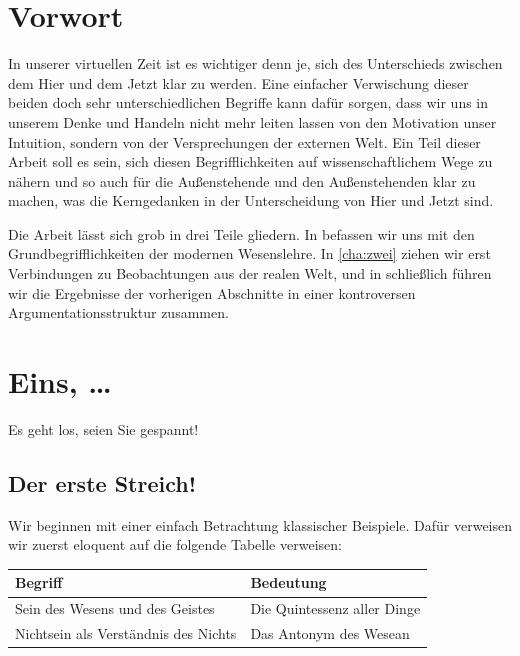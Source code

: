 \documentclass{scrbook}
\begin{document}
\chapter*{Vorwort}

In unserer virtuellen Zeit ist es wichtiger denn je, sich des Unterschieds
zwischen dem Hier und dem Jetzt klar zu werden.  Eine einfacher Verwischung
dieser beiden doch sehr unterschiedlichen Begriffe kann dafür sorgen, dass wir
uns in unserem Denke und Handeln nicht mehr leiten lassen von den Motivation
unser Intuition, sondern von der Versprechungen der externen Welt.  Ein Teil
dieser Arbeit soll es sein, sich diesen Begrifflichkeiten auf wissenschaftlichem
Wege zu nähern und so auch für die Außenstehende und den Außenstehenden klar zu
machen, was die Kerngedanken in der Unterscheidung von Hier und Jetzt sind.

Die Arbeit lässt sich grob in drei Teile gliedern.  In  befassen
wir uns mit den Grundbegrifflichkeiten der modernen Wesenslehre.  In
\ref{cha:zwei} ziehen wir erst Verbindungen zu Beobachtungen aus der realen
Welt, und in  schließlich führen wir die Ergebnisse der
vorherigen Abschnitte in einer kontroversen Argumentationsstruktur zusammen.

\cleardoublepage

\tableofcontents

\mainmatter

\chapter{Eins, \dots}
\label{cha:eins}

Es geht los, seien Sie gespannt!

\section{Der erste Streich!}
\label{sec:der-erste-streich}

Wir beginnen mit einer einfach Betrachtung klassischer Beispiele.  Dafür
verweisen wir zuerst eloquent auf die folgende Tabelle verweisen:

\begin{center}
  \begin{tabu}{XX}
    \toprule
    Begriff & Bedeutung \\\midrule
    Sein des Wesens und des Geistes & Die Quintessenz aller Dinge \\
    Nichtsein als Verständnis des Nichts & Das Antonym des Wesean \\
    \bottomrule
  \end{tabu}
\end{center}
\end{document}
